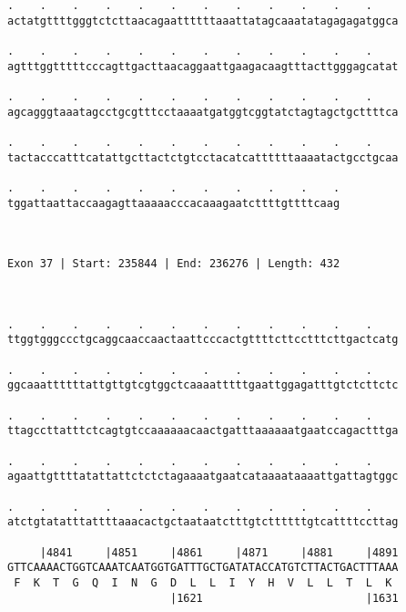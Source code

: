 \documentclass{article}
\begin{document}
\begin{Verbatim}
.    .    .    .    .    .    .    .    .    .    .    .    
actatgttttgggtctcttaacagaattttttaaattatagcaaatatagagagatggca
                                                            
.    .    .    .    .    .    .    .    .    .    .    .    
agtttggtttttcccagttgacttaacaggaattgaagacaagtttacttgggagcatat
                                                            
.    .    .    .    .    .    .    .    .    .    .    .    
agcagggtaaatagcctgcgtttcctaaaatgatggtcggtatctagtagctgcttttca
                                                            
.    .    .    .    .    .    .    .    .    .    .    .    
tactacccatttcatattgcttactctgtcctacatcattttttaaaatactgcctgcaa
                                                            
.    .    .    .    .    .    .    .    .    .    .
tggattaattaccaagagttaaaaacccacaaagaatcttttgttttcaag
                                                   
                                                   
 
Exon 37 | Start: 235844 | End: 236276 | Length: 432



.    .    .    .    .    .    .    .    .    .    .    .    
ttggtgggccctgcaggcaaccaactaattcccactgttttcttcctttcttgactcatg
                                                            
.    .    .    .    .    .    .    .    .    .    .    .    
ggcaaattttttattgttgtcgtggctcaaaatttttgaattggagatttgtctcttctc
                                                            
.    .    .    .    .    .    .    .    .    .    .    .    
ttagccttatttctcagtgtccaaaaaacaactgatttaaaaaatgaatccagactttga
                                                            
.    .    .    .    .    .    .    .    .    .    .    .    
agaattgttttatattattctctctagaaaatgaatcataaaataaaattgattagtggc
                                                            
.    .    .    .    .    .    .    .    .    .    .    .    
atctgtatatttattttaaacactgctaataatctttgtcttttttgtcattttccttag
                                                            
     |4841     |4851     |4861     |4871     |4881     |4891
GTTCAAAACTGGTCAAATCAATGGTGATTTGCTGATATACCATGTCTTACTGACTTTAAA
 F  K  T  G  Q  I  N  G  D  L  L  I  Y  H  V  L  L  T  L  K 
                         |1621                         |1631
  

\end{Verbatim}
\end{document}
